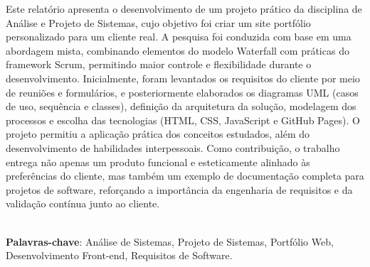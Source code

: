 \begin{thesisresumo}
Este relatório apresenta o desenvolvimento de um projeto prático da disciplina de Análise e Projeto de Sistemas, cujo objetivo foi criar um site portfólio personalizado para um cliente real. A pesquisa foi conduzida com base em uma abordagem mista, combinando elementos do modelo Waterfall com práticas do framework Scrum, permitindo maior controle e flexibilidade durante o desenvolvimento. Inicialmente, foram levantados os requisitos do cliente por meio de reuniões e formulários, e posteriormente elaborados os diagramas UML (casos de uso, sequência e classes), definição da arquitetura da solução, modelagem dos processos e escolha das tecnologias (HTML, CSS, JavaScript e GitHub Pages). O projeto permitiu a aplicação prática dos conceitos estudados, além do desenvolvimento de habilidades interpessoais. Como contribuição, o trabalho entrega não apenas um produto funcional e esteticamente alinhado às preferências do cliente, mas também um exemplo de documentação completa para projetos de software, reforçando a importância da engenharia de requisitos e da validação contínua junto ao cliente.

\ \\


\textbf{Palavras-chave}: Análise de Sistemas, Projeto de Sistemas, Portfólio Web, Desenvolvimento Front-end, Requisitos de Software.

\end{thesisresumo}
